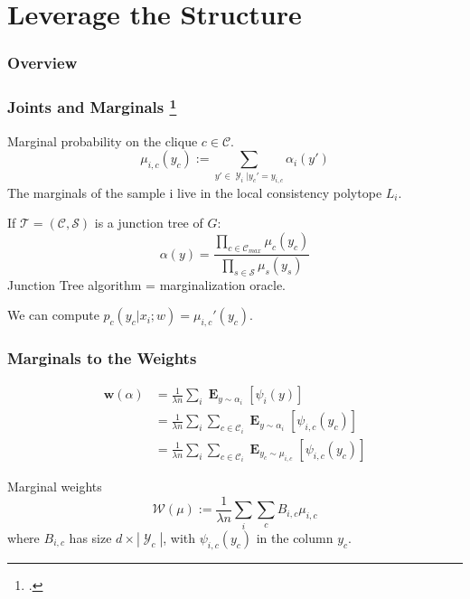 \documentclass{beamer}
\DeclareMathOperator{\1}{\mathbb{1}}
\DeclareMathOperator{\E}{\mathbf{E}}
\DeclareMathOperator{\Y}{\mathcal{Y}}
\begin{document}
\section{Leverage the Structure}
\begin{frame}
	\frametitle{Overview}
	\tableofcontents[currentsection]  
\end{frame}
\begin{frame}[fragile]
	\frametitle{Joints and Marginals \footcite{taskar_max-margin_2004} }
	
	Marginal probability on the clique $c \in \mathcal C$.
	\begin{equation*}
	\label{marginals definition}
	\mu_{i, c}(y_c) := \sum_{y'\in \Y_i | y_c' = y_{i, c}} \alpha_i(y')
	\end{equation*}
	The marginals of the sample i live in the local consistency polytope $L_i$.
	
	If $\mathcal T = (\mathcal C, \mathcal S)$ is a junction tree of $G$:
	\begin{equation}
		\label{joint from marginals}
		\alpha(y) = \frac{\prod_{c\in\mathcal{C}_{max}} \mu_c(y_c)}{\prod_{s\in\mathcal{S}} \mu_s(y_s)}
	\end{equation}
	Junction Tree algorithm = marginalization oracle.
	\begin{center}
		We can compute $p_c(y_c | x_i ; w) = \mu_{i,c}'(y_c)$.
	\end{center}

\end{frame}
\begin{frame}
	\frametitle{Marginals to the Weights}	
	
	\begin{align*}
	\bm w(\alpha)
	& = \frac{1}{\lambda n} \sum_i \E_{y \sim \alpha_i}[\psi_i(y)] \\
   	&  = \frac{1}{\lambda n} \sum_i \sum_{c \in \mathcal C_i} \E_{y \sim \alpha_i}  [\psi_{i, c}(y_c)]  \\
   	&  = \frac{1}{\lambda n} \sum_i \sum_{c \in \mathcal C_i} \E_{y_c \sim \mu_{i, c}}  [\psi_{i, c}(y_c)] 
	\end{align*}

\begin{block}{Marginal weights}
	\begin{equation*}
		\mathcal W (\mu) := \frac{1}{\lambda n} \sum_i \sum_c B_{i, c} \mu_{i, c}
	\end{equation*}
	where $B_{i, c}$ has size $d\times |\Y_c|$, with $\psi_{i, c}(y_c)$ in the column $y_c$.
\end{block}
	
\end{frame}
\end{document}
